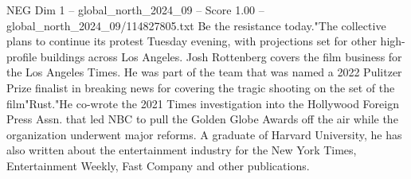 \begin{textsample}{NEG Dim 1 – global\_north\_2024\_09 – Score 1.00 – global\_north\_2024\_09/114827805.txt}
Be the resistance today."The collective plans to continue its protest Tuesday evening, with projections set for other high-profile buildings across Los Angeles.
Josh Rottenberg covers the film business for the Los Angeles Times.
He was part of the team that was named a 2022 Pulitzer Prize finalist in breaking news for covering the tragic shooting on the set of the film"Rust."He co-wrote the 2021 Times investigation into the Hollywood Foreign Press Assn. that led NBC to pull the Golden Globe Awards off the air while the organization underwent major reforms.
A graduate of Harvard University, he has also written about the entertainment industry for the New York Times, Entertainment Weekly, Fast Company and other publications.

\end{textsample}
